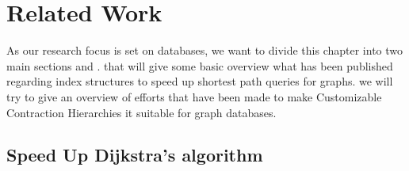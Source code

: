 \chapter{Related Work} 

As our research focus is set on databases, we want to divide this chapter into two main sections  and .
 that will give some basic overview what has been published regarding index structures to speed up shortest path queries for graphs.
 we will try to give an overview of efforts that have been made to make Customizable Contraction Hierarchies \cite{CCH} it suitable for graph databases.

\section{Speed Up Dijkstra's algorithm} \label{sec:algorithmic_history}


